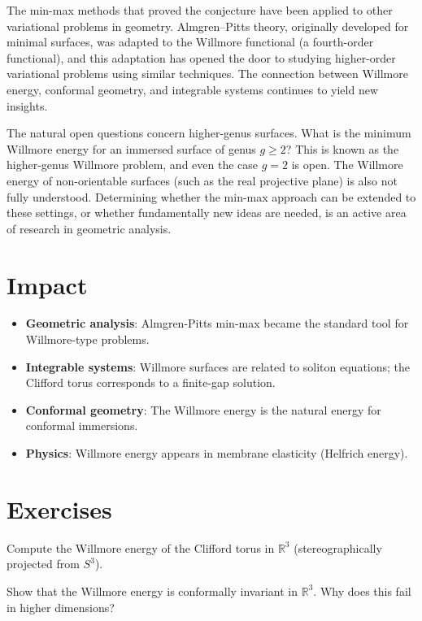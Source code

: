 The min-max methods that proved the conjecture have been applied to other variational problems in geometry. Almgren--Pitts theory, originally developed for minimal surfaces, was adapted to the Willmore functional (a fourth-order functional), and this adaptation has opened the door to studying higher-order variational problems using similar techniques. The connection between Willmore energy, conformal geometry, and integrable systems continues to yield new insights.

The natural open questions concern higher-genus surfaces. What is the minimum Willmore energy for an immersed surface of genus $g \ge 2$? This is known as the higher-genus Willmore problem, and even the case $g = 2$ is open. The Willmore energy of non-orientable surfaces (such as the real projective plane) is also not fully understood. Determining whether the min-max approach can be extended to these settings, or whether fundamentally new ideas are needed, is an active area of research in geometric analysis.

\section{Impact}
\begin{itemize}
\item \textbf{Geometric analysis}: Almgren-Pitts min-max became the standard tool for Willmore-type problems.
\item \textbf{Integrable systems}: Willmore surfaces are related to soliton equations; the Clifford torus corresponds to a finite-gap solution.
\item \textbf{Conformal geometry}: The Willmore energy is the natural energy for conformal immersions.
\item \textbf{Physics}: Willmore energy appears in membrane elasticity (Helfrich energy).
\end{itemize}

\section{Exercises}

\begin{exercise}[Basic]
Compute the Willmore energy of the Clifford torus in $\mathbb{R}^3$ (stereographically projected from $S^3$).
\end{exercise}

\begin{exercise}[Intermediate]
Show that the Willmore energy is conformally invariant in $\mathbb{R}^3$. Why does this fail in higher dimensions?
\end{exercise}


